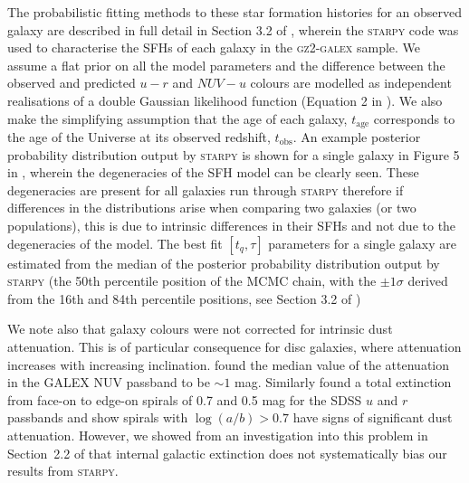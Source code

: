 \documentclass[useAMS,usenatbib]{mn2e}
\begin{document}

The probabilistic fitting methods to these star formation histories for an observed galaxy are described in full detail in Section 3.2 of \cite{smethurst15}, wherein the \textsc{starpy} code was used to characterise the SFHs of each galaxy in the \textsc{gz2-galex} sample. We assume a flat prior on all the model parameters and the difference between the observed and predicted $u-r$ and $NUV-u$ colours are modelled as independent realisations of a double Gaussian likelihood function (Equation 2 in \citealt{smethurst15}). We also make the simplifying assumption that the age of each galaxy, $t_\mathrm{age}$ corresponds to the age of the Universe at its observed redshift, $t_\mathrm{obs}$. An example posterior probability distribution output by \textsc{starpy} is shown for a single galaxy in Figure 5 in \cite{smethurst15}, wherein the degeneracies of the SFH model can be clearly seen. These degeneracies are present for all galaxies run through \textsc{starpy} therefore if differences in the distributions arise when comparing two galaxies (or two populations), this is due to intrinsic differences in their SFHs and not due to the degeneracies of the model. The best fit $[t_q, \tau]$ parameters for a single galaxy are estimated from the median of the posterior probability distribution output by \textsc{starpy} (the 50th percentile position of the MCMC chain, with the $\pm1\sigma$ derived from the 16th and 84th percentile positions, see Section 3.2 of \citealt{smethurst15})

We note also that galaxy colours were not corrected for intrinsic dust attenuation. This is of particular consequence for disc galaxies, where attenuation increases with increasing inclination. \cite{Buat05} found the median value of the attenuation in the GALEX NUV passband to be $\sim 1$ mag. Similarly \cite{masters10c} found a total extinction from face-on to edge-on spirals of 0.7 and 0.5 mag for the SDSS $u$ and $r$ passbands and show spirals with $\log(a/b) > 0.7$ have signs of significant dust attenuation. However, we showed from an investigation into this problem in Section~2.2 of \citet{smethurst16} that internal galactic extinction does not systematically bias our results from \textsc{starpy}. 
\end{document}
